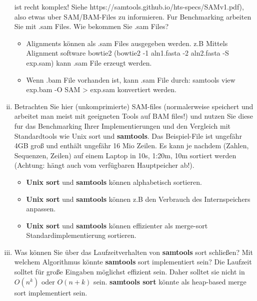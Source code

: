 \documentclass{article}
\begin{document}
\begin{flushleft}
\begin{enumerate}[(i)]
    ist recht komplex! Siehe https://samtools.github.io/hts-specs/SAMv1.pdf), also
    etwas uber SAM/BAM-Files zu informieren. 
    \newline
    Fur Benchmarking arbeiten Sie mit .sam Files. Wie bekommen Sie .sam Files?
    \newline
    \begin{itemize}
        \item Alignments können als .sam Files ausgegeben werden. z.B Mittels Alignment software bowtie2 
        (bowtie2 -1 aln1.fasta -2 aln2.fasta -S exp.sam) kann .sam File erzeugt werden.
        \item Wenn .bam File vorhanden ist, kann .sam File durch: samtools view exp.bam -O SAM > exp.sam
        konvertiert werden.
    \end{itemize}
    \item Betrachten Sie hier (unkomprimierte) SAM-files (normalerweise speichert und arbeitet
    man meist mit geeigneten Tools auf BAM files!) und nutzen Sie diese fur das Benchmarking Ihrer 
    Implementierungen und den Vergleich mit Standardtools wie Unix sort und
    \textbf{samtools}. Das Beispiel-File ist ungefähr 4GB groß und enthält ungefähr 16 Mio Zeilen.
    Es kann je nachdem (Zahlen, Sequenzen, Zeilen) auf einem Laptop in 10s, 1:20m, 10m
    sortiert werden (Achtung: hängt auch vom verfügbaren Hauptpeicher ab!). 
    \begin{itemize}
        \item \textbf{Unix sort} und \textbf{samtools} können alphabetisch sortieren.
        \item \textbf{Unix sort} und \textbf{samtools} können z.B den Verbrauch des Internspeichers anpassen.
        \item \textbf{Unix sort} und \textbf{samtools} können effizienter als merge-sort Standardimplementierung sortieren. 
    \end{itemize}
    \item Was können Sie über das Laufzeitverhalten von \textbf{samtools} sort schließen? Mit welchem
    Algorithmus könnte \textbf{samtools} sort implementiert sein?
    \newline
    Die Laufzeit solltet für große Eingaben möglichst effizient sein. Daher solltet sie nicht in $O(n^k)$ oder $O(n+k)$ sein. 
    \textbf{samtools sort} könnte als heap-based merge sort implementiert sein.
\end{enumerate}
\end{flushleft}
\end{document}
